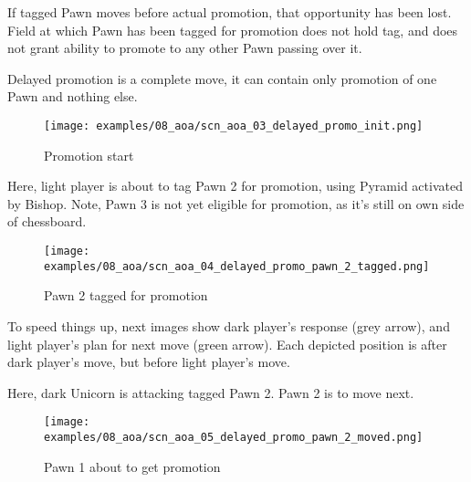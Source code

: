 If tagged Pawn moves before actual promotion, that opportunity has been
lost. Field at which Pawn has been tagged for promotion does not hold tag,
and does not grant ability to promote to any other Pawn passing over it.

Delayed promotion is a complete move, it can contain only promotion of one
Pawn and nothing else.

\clearpage %

\noindent
\begin{figure}[h]
\texttt{[image: examples/08\_aoa/scn\_aoa\_03\_delayed\_promo\_init.png]}
\caption{Promotion start}
\label{fig:scn_aoa_03_delayed_promo_init}
\end{figure}

Here, light player is about to tag Pawn 2 for promotion, using Pyramid
activated by Bishop. Note, Pawn 3 is not yet eligible for promotion, as it's
still on own side of chessboard.

\clearpage %

\noindent
\begin{figure}[h]
\texttt{[image: examples/08\_aoa/scn\_aoa\_04\_delayed\_promo\_pawn\_2\_tagged.png]}
\caption{Pawn 2 tagged for promotion}
\label{fig:scn_aoa_04_delayed_promo_pawn_2_tagged}
\end{figure}

To speed things up, next images show dark player's response (grey arrow),
and light player's plan for next move (green arrow). Each depicted position
is after dark player's move, but before light player's move.

Here, dark Unicorn is attacking tagged Pawn 2. Pawn 2 is to move next.

\clearpage %

\noindent
\begin{figure}[h]
\texttt{[image: examples/08\_aoa/scn\_aoa\_05\_delayed\_promo\_pawn\_2\_moved.png]}
\caption{Pawn 1 about to get promotion}
\label{fig:scn_aoa_05_delayed_promo_pawn_2_moved}
\end{figure}


